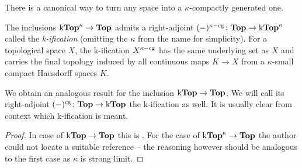 There is a canonical way to turn any space into a $\kappa$-compactly generated one.
\begin{lemma}[k-ification]
	The inclusions ${\mathrm{k}{{\mathbf{Top}}}^{\kappa}}\to {{\mathbf{Top}}}$ admits a right-adjoint $(-)^{\kappa\mathrm{-cg}}\colon {{\mathbf{Top}}}\to{\mathrm{k}{{\mathbf{Top}}}^{\kappa}}$ called the \emph{k-ification} (omitting the $\kappa$ from the name for simplicity). For a topological space $X$, the k-ification $X^{\kappa\mathrm{-cg}}$ has the same underlying set as $X$ and carries the final topology induced by all continuous maps $K\to X$ from a $\kappa$-small compact Hausdorff spaces $K$. 
	
	We obtain an analogous result for the inclusion ${\mathrm{k}{{\mathbf{Top}}}}\to{{\mathbf{Top}}}$. We will call its right-adjoint $(-)^{\mathrm{cg}}\colon {{\mathbf{Top}}}\to{\mathrm{k}{{\mathbf{Top}}}}$ the k-ification as well. It is usually clear from context which k-ification is meant.
	
	
\end{lemma}
\begin{proof}
	In case of ${\mathrm{k}{{\mathbf{Top}}}}\to {{\mathbf{Top}}}$ this is \cite[Prop. 3.2]{compact-generation}. For the case of ${\mathrm{k}{{\mathbf{Top}}}^{\kappa}}\to {{\mathbf{Top}}}$ the author could not locate a suitable reference -- the reasoning however should be analogous to the first case as $\kappa$ is strong limit.
\end{proof}

